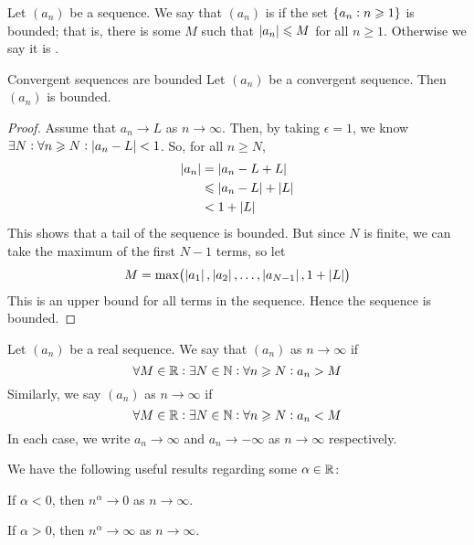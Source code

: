 \documentclass{styles/tufte}
\begin{document}
    \begin{definition}{}{}
      Let $(a_n)$ be a sequence. We say that $(a_n)$ is  if the set $\set{a_n : n \geqslant 1}$ is bounded; that is, there is some $M$ such that $\abs{a_n} \leqslant M$ for all $n \geqslant 1$. Otherwise we say it is .
    \end{definition}
    
    \begin{proposition}{Convergent sequences are bounded}{}
      Let $(a_n)$ be a convergent sequence. Then $(a_n)$ is bounded.
    \end{proposition}
    \begin{proof}
      Assume that $a_n \to L$ as $n \to \infty$. Then, by taking $\epsilon = 1$, we know $\exists N : \forall n \geqslant N : \abs{a_n - L} < 1$. So, for all $n \geqslant N$,
      \begin{align*}
        \abs{a_n} &= \abs{a_n - L + L} \\
        &\leqslant \abs{a_n - L} + \abs{L} \\
        &< 1 + \abs{L}
      \end{align*}
      This shows that a tail of the sequence is bounded. But since $N$ is finite, we can take the maximum of the first $N - 1$ terms, so let
      \[ M = \max\left(\abs{a_1}, \abs{a_2}, \dots, \abs{a_{N - 1}}, 1 + \abs{L}\right) \]
      This is an upper bound for all terms in the sequence. Hence the sequence is bounded.
    \end{proof}
    
    \begin{definition}{}{}
      Let $(a_n)$ be a real sequence. We say that $(a_n)$  as $n \to \infty$ if
      \[ \forall M \in \mathbb{R} : \exists N \in \mathbb{N} : \forall n \geqslant N : a_n > M \]
      Similarly, we say $(a_n)$  as $n \to \infty$ if
      \[ \forall M \in \mathbb{R} : \exists N \in \mathbb{N} : \forall n \geqslant N : a_n < M \]
      In each case, we write $a_n \to \infty$ and $a_n \to -\infty$ as $n \to \infty$ respectively.
    \end{definition}
    
    \begin{lemma}{}{}
      We have the following useful results regarding some $\alpha \in \mathbb{R}$:
      \begin{romanenum}
        \item If $\alpha < 0$, then $n^\alpha \to 0$ as $n \to \infty$.
        \item If $\alpha > 0$, then $n^\alpha \to \infty$ as $n \to \infty$.
      \end{romanenum}
    \end{lemma}
    
\end{document}
